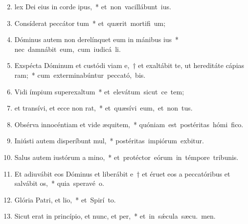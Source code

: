 \begin{flushleft}
\begin{enumerate}[leftmargin=*]
\setcounter{enumi}{1}

\item lex Dei eius in corde ipus,~* \mbox{et non vacillábunt  ius.}

\item Consíderat peccátor tum~* \mbox{et quærit mortifi um;}

\item Dóminus autem non derelínquet eum in mánibus ius~* \mbox{nec damnábit eum, cum iudicá li.}

\item Exspécta Dóminum et custódi viam e,~† et exaltábit te, ut hereditáte cápias ram;~* \mbox{cum exterminabúntur peccató, bis.}

\item Vidi ímpium superexaltum~* \mbox{et elevátum sicut ce tem;}

\item et transívi, et ecce non rat,~* \mbox{et quæsívi eum, et non  tus.}

\item Obsérva innocéntiam et vide æquitem,~* \mbox{quóniam est postéritas hómi fico.}

\item Iniústi autem disperíbunt mul,~* \mbox{postéritas impiórum exbitur.}

\item Salus autem iustórum a mino,~* \mbox{et protéctor eórum in témpore tribunis.}

\item Et adiuvábit eos Dóminus et liberábit e~† et éruet eos a peccatóribus et salvábit os,~* \mbox{quia speravé  o.}

\item Glória Patri, et lio,~* \mbox{et Spirí to.}

\item Sicut erat in princípio, et nunc, et per,~* \mbox{et in s\'{\ae}cula sæcu. men.}

\end{enumerate}
\end{flushleft}

